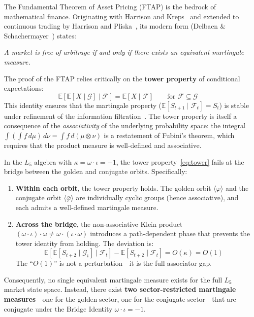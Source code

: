 The Fundamental Theorem of Asset Pricing (FTAP) is the bedrock of mathematical finance. Originating with Harrison and Kreps~\cite{harrison_kreps1979} and extended to continuous trading by Harrison and Pliska~\cite{harrison_pliska1981}, its modern form (Delbaen \& Schachermayer~\cite{delbaen1994}) states:

\begin{center}
\emph{A market is free of arbitrage if and only if there exists an equivalent martingale measure.}
\end{center}

The proof of the FTAP relies critically on the \textbf{tower property} of conditional expectations:
\begin{equation}\label{eq:tower}
    \mathbb{E}[\mathbb{E}[X \mid \mathcal{G}] \mid \mathcal{F}] = \mathbb{E}[X \mid \mathcal{F}] \qquad \text{for } \mathcal{F} \subseteq \mathcal{G}
\end{equation}
This identity ensures that the martingale property ($\mathbb{E}[S_{t+1} \mid \mathcal{F}_t] = S_t$) is stable under refinement of the information filtration~\cite{doob1953}. The tower property is itself a consequence of the \emph{associativity} of the underlying probability space: the integral $\int (\int f \, d\mu) \, d\nu = \int f \, d(\mu \otimes \nu)$ is a restatement of Fubini's theorem, which requires that the product measure is well-defined and associative.

\begin{theorem}\label{thm:ftap_break}
In the $L_5$ algebra with $\kappa = \omega \cdot \iota = -1$, the tower property~\eqref{eq:tower} fails at the bridge between the golden and conjugate orbits. Specifically:
\begin{enumerate}[noitemsep]
    \item \textbf{Within each orbit}, the tower property holds. The golden orbit $\langle\varphi\rangle$ and the conjugate orbit $\langle\bar\varphi\rangle$ are individually cyclic groups (hence associative), and each admits a well-defined martingale measure.
    \item \textbf{Across the bridge}, the non-associative Klein product $(\omega \cdot \iota) \cdot \omega \neq \omega \cdot (\iota \cdot \omega)$ introduces a path-dependent phase that prevents the tower identity from holding. The deviation is:
    \begin{equation}
        \mathbb{E}[\mathbb{E}[S_{t+2} \mid \mathcal{G}_t] \mid \mathcal{F}_t] - \mathbb{E}[S_{t+2} \mid \mathcal{F}_t] = O(\kappa) = O(1)
    \end{equation}
    The ``$O(1)$'' is not a perturbation---it is the full associator gap.
\end{enumerate}
Consequently, no single equivalent martingale measure exists for the full $L_5$ market state space. Instead, there exist \textbf{two sector-restricted martingale measures}---one for the golden sector, one for the conjugate sector---that are conjugate under the Bridge Identity $\omega \cdot \iota = -1$.
\end{theorem}

